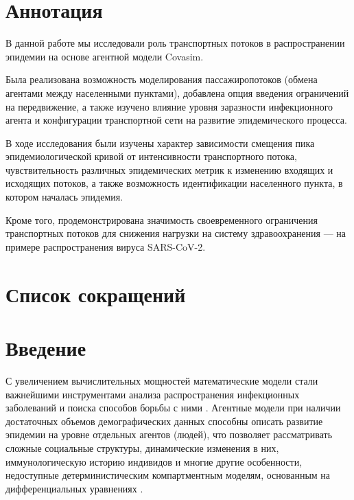 \documentclass[a4paper,12pt]{article} %
\begin{document}
\section*{Аннотация}
В данной работе мы исследовали роль транспортных потоков в распространении эпидемии на основе агентной модели Covasim.

Была реализована возможность моделирования пассажиропотоков (обмена агентами между населенными пунктами), добавлена опция введения ограничений на передвижение, а также изучено влияние уровня заразности инфекционного агента и конфигурации транспортной сети на развитие эпидемического процесса.

В ходе исследования были изучены характер зависимости смещения пика эпидемиологической кривой от интенсивности транспортного потока, чувствительность различных эпидемических метрик к изменению входящих и исходящих потоков, а также возможность идентификации населенного пункта, в котором началась эпидемия.

Кроме того, продемонстрирована значимость своевременного ограничения транспортных потоков для снижения нагрузки на систему здравоохранения — на примере распространения вируса SARS-CoV-2.


\newpage

\section*{Список сокращений}
\printglossary[type=\acronymtype, title={}]
\newpage

\tableofcontents
\newpage



\section{Введение}
С увеличением вычислительных мощностей математические модели стали важнейшими инструментами анализа распространения инфекционных заболеваний и поиска способов борьбы с ними \cite{hethcote2000mathematics, hethcote1989three, hethcote1992transmission}. Агентные модели при наличии достаточных объемов демографических данных способны описать развитие эпидемии на уровне отдельных агентов (людей), что позволяет рассматривать сложные социальные структуры, динамические изменения в них, иммунологическую историю индивидов и многие другие особенности, недоступные детерминистическим компартментным моделям, основанным на дифференциальных уравнениях \cite{rakowski2010influenza}.
\end{document}
